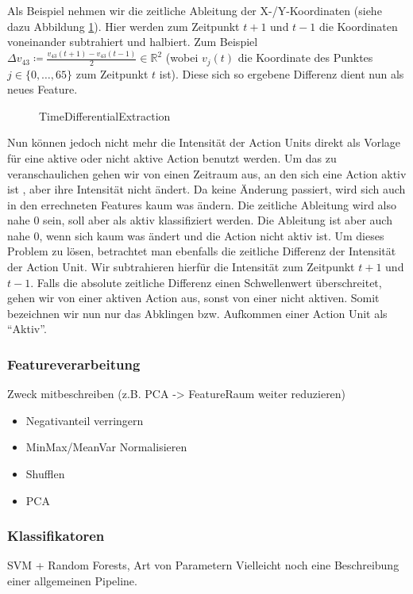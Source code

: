 Als Beispiel nehmen wir die zeitliche Ableitung der X-/Y-Koordinaten (siehe dazu Abbildung \ref{fig:timediff}). 
Hier werden zum Zeitpunkt $t+1$ und $t-1$ die Koordinaten voneinander subtrahiert und halbiert. Zum Beispiel $\Delta v_{43} \coloneqq \frac{v_{43}(t+1) - v_{43}(t-1)}{2}\in\mathbb{R}^2$ (wobei $v_{j}(t)$ die Koordinate des Punktes $j\in\{0,\ldots,65\}$ zum Zeitpunkt $t$ ist).
Diese sich so ergebene Differenz dient nun als neues Feature.

\begin{figure}

\caption{TimeDifferentialExtraction}
\label{fig:timediff}
\end{figure}

Nun können jedoch nicht mehr die Intensität der Action Units direkt als Vorlage für eine aktive oder nicht aktive Action benutzt werden. 
Um das zu veranschaulichen gehen wir von einen Zeitraum aus, an den sich eine Action aktiv ist , aber ihre Intensität nicht ändert.
Da keine Änderung passiert, wird sich auch in den errechneten Features kaum was ändern. Die zeitliche Ableitung wird also nahe $0$ sein, soll aber als aktiv klassifiziert werden. Die Ableitung ist aber auch nahe $0$, wenn sich kaum was ändert und die Action nicht aktiv ist.
Um dieses Problem zu lösen, betrachtet man ebenfalls die zeitliche Differenz der Intensität der Action Unit. Wir subtrahieren hierfür die Intensität zum Zeitpunkt $t+1$ und $t-1$. Falls die absolute zeitliche Differenz einen Schwellenwert überschreitet, gehen wir von einer aktiven Action aus, sonst von einer nicht aktiven. Somit bezeichnen wir nun nur das Abklingen bzw. Aufkommen einer Action Unit als "`Aktiv"'.

\subsubsection{Featureverarbeitung}
Zweck mitbeschreiben (z.B. PCA -> FeatureRaum weiter reduzieren)
\begin{itemize}
  \item Negativanteil verringern
  \item MinMax/MeanVar Normalisieren
  \item Shufflen
  \item PCA
\end{itemize}

\subsubsection{Klassifikatoren}
SVM + Random Forests, Art von Parametern
Vielleicht noch eine Beschreibung einer allgemeinen Pipeline.


